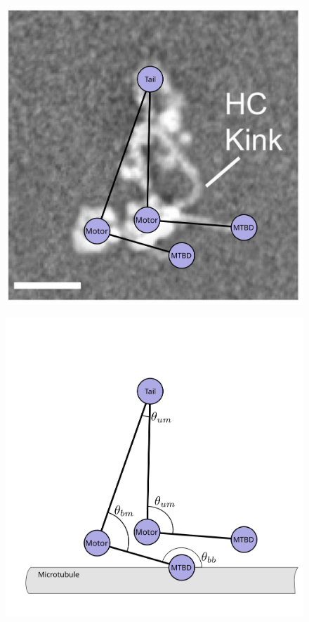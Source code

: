 \documentclass{article}
\begin{document}
\begin{figure}
\begin{minipage}{.3\textwidth}
   \label{fig:modlengths}
 \end{minipage}%
 \begin{minipage}{.3\textwidth}
   \centering
   \includegraphics[width=\linewidth]{figures/schematic-2-superimposed}
   \label{fig:modlengths}
 \end{minipage}%
 \begin{minipage}{.3\textwidth}
   \centering
   \includegraphics[width=\linewidth]{figures/schematic-2-model}

\end{minipage}
\end{figure}
\end{document}
